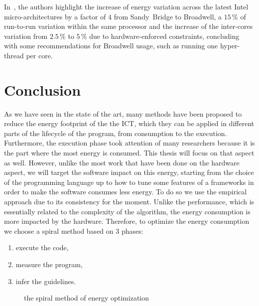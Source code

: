 In~\cite{marathe_empirical_2017_m}, the authors highlight the increase of energy variation across the latest Intel micro-architectures by a factor of $4$ from Sandy~Bridge to Broadwell, a $15\,\%$ of run-to-run variation within the same processor and the increase of the inter-cores variation from $2.5\,\%$ to $5\,\%$ due to hardware-enforced constraints, concluding with some recommendations for Broadwell usage, such as running one hyper-thread per core.



\section{Conclusion}
As we have seen in the state of the art, many methods have been proposed to reduce the energy footprint of the the ICT, which they can be applied in different parts of the lifecycle of the program, from consumption to the execution.
Furthermore, the execution phase took attention of many researchers because it is the part where the most energy is consumed.
This thesis will focus on that aspect as well.
However, unlike the most work that have been done on the hardware aspect, we will target the software impact on this energy, starting from the choice of the programming language up to how to tune some features of a frameworks in order to make the software consumes less energy.
To do so we use the empirical approach due to its consistency for the moment.
Unlike the performance, which is essentially related to the complexity of the algorithm, the energy consumption is more impacted by the hardware.
Therefore, to optimize the energy consumption we choose a spiral method based on 3 phases:
\begin{enumerate}
    \item execute the code,
    \item measure the program,
    \item infer the guidelines.
\end{enumerate}


\begin{figure}[!hbt]
    \caption{the spiral method of energy optimization }\label{fig:spirals}
\end{figure}

